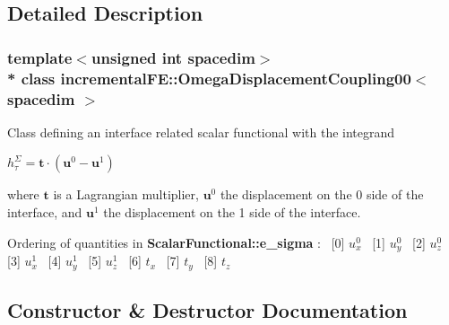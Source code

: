 \subsection{Detailed Description}
\subsubsection*{template$<$unsigned int spacedim$>$\\*
class incremental\+F\+E\+::\+Omega\+Displacement\+Coupling00$<$ spacedim $>$}

Class defining an interface related scalar functional with the integrand

$ h^\Sigma_\tau = \boldsymbol{t} \cdot \left( \boldsymbol{u}^0 - \boldsymbol{u}^1 \right) $

where $\boldsymbol{t}$ is a Lagrangian multiplier, $\boldsymbol{u}^0$ the displacement on the 0 side of the interface, and $\boldsymbol{u}^1$ the displacement on the 1 side of the interface.

Ordering of quantities in {\bf Scalar\+Functional\+::e\+\_\+sigma} \+:~\newline
\mbox{[}0\mbox{]} $u^0_x$~\newline
 \mbox{[}1\mbox{]} $u^0_y$~\newline
 \mbox{[}2\mbox{]} $u^0_z$~\newline
 \mbox{[}3\mbox{]} $u^1_x$~\newline
 \mbox{[}4\mbox{]} $u^1_y$~\newline
 \mbox{[}5\mbox{]} $u^1_z$~\newline
 \mbox{[}6\mbox{]} $t_x$~\newline
 \mbox{[}7\mbox{]} $t_y$~\newline
 \mbox{[}8\mbox{]} $t_z$~\newline
 

\subsection{Constructor \& Destructor Documentation}
